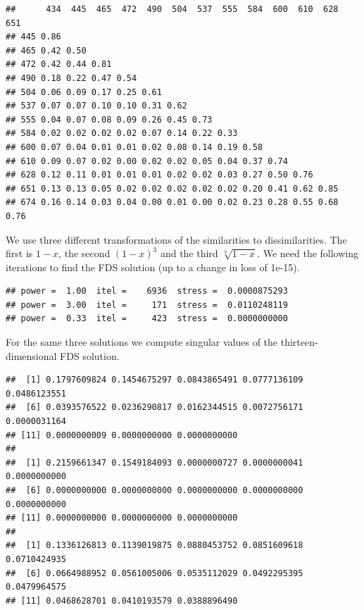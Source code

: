 \documentclass[
  12pt,
]{book}
\theoremstyle{definition}
\theoremstyle{definition}
\theoremstyle{definition}
\theoremstyle{definition}
\theoremstyle{remark}
\begin{document}
\begin{verbatim}
##      434  445  465  472  490  504  537  555  584  600  610  628  651
## 445 0.86                                                            
## 465 0.42 0.50                                                       
## 472 0.42 0.44 0.81                                                  
## 490 0.18 0.22 0.47 0.54                                             
## 504 0.06 0.09 0.17 0.25 0.61                                        
## 537 0.07 0.07 0.10 0.10 0.31 0.62                                   
## 555 0.04 0.07 0.08 0.09 0.26 0.45 0.73                              
## 584 0.02 0.02 0.02 0.02 0.07 0.14 0.22 0.33                         
## 600 0.07 0.04 0.01 0.01 0.02 0.08 0.14 0.19 0.58                    
## 610 0.09 0.07 0.02 0.00 0.02 0.02 0.05 0.04 0.37 0.74               
## 628 0.12 0.11 0.01 0.01 0.01 0.02 0.02 0.03 0.27 0.50 0.76          
## 651 0.13 0.13 0.05 0.02 0.02 0.02 0.02 0.02 0.20 0.41 0.62 0.85     
## 674 0.16 0.14 0.03 0.04 0.00 0.01 0.00 0.02 0.23 0.28 0.55 0.68 0.76
\end{verbatim}

We use three different transformations of the similarities to dissimilarities. The first is \(1-x\), the second \((1-x)^3\) and the third \(\sqrt[3]{1-x}\). We need the following iterations to find the FDS solution (up to a change in loss of 1e-15).

\begin{verbatim}
## power =  1.00  itel =    6936  stress =  0.0000875293 
## power =  3.00  itel =     171  stress =  0.0110248119 
## power =  0.33  itel =     423  stress =  0.0000000000
\end{verbatim}

For the same three solutions we compute singular values of the thirteen-dimensional FDS solution.

\begin{verbatim}
##  [1] 0.1797609824 0.1454675297 0.0843865491 0.0777136109 0.0486123551
##  [6] 0.0393576522 0.0236290817 0.0162344515 0.0072756171 0.0000031164
## [11] 0.0000000009 0.0000000000 0.0000000000
## 
##  [1] 0.2159661347 0.1549184093 0.0000000727 0.0000000041 0.0000000000
##  [6] 0.0000000000 0.0000000000 0.0000000000 0.0000000000 0.0000000000
## [11] 0.0000000000 0.0000000000 0.0000000000
## 
##  [1] 0.1336126813 0.1139019875 0.0880453752 0.0851609618 0.0710424935
##  [6] 0.0664988952 0.0561005006 0.0535112029 0.0492295395 0.0479964575
## [11] 0.0468628701 0.0410193579 0.0388896490
\end{verbatim}
\end{document}

